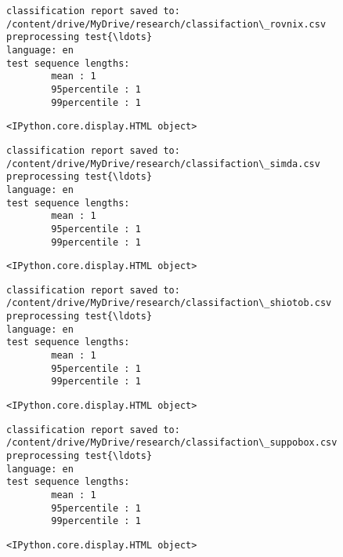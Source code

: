 \documentclass[11pt]{article}
\begin{document}
    
    \begin{Verbatim}[commandchars=\\\{\}]
classification report saved to:
/content/drive/MyDrive/research/classifaction\_rovnix.csv
preprocessing test{\ldots}
language: en
test sequence lengths:
        mean : 1
        95percentile : 1
        99percentile : 1
    \end{Verbatim}

    
    \begin{Verbatim}[commandchars=\\\{\}]
<IPython.core.display.HTML object>
    \end{Verbatim}

    
    \begin{Verbatim}[commandchars=\\\{\}]
classification report saved to:
/content/drive/MyDrive/research/classifaction\_simda.csv
preprocessing test{\ldots}
language: en
test sequence lengths:
        mean : 1
        95percentile : 1
        99percentile : 1
    \end{Verbatim}

    
    \begin{Verbatim}[commandchars=\\\{\}]
<IPython.core.display.HTML object>
    \end{Verbatim}

    
    \begin{Verbatim}[commandchars=\\\{\}]
classification report saved to:
/content/drive/MyDrive/research/classifaction\_shiotob.csv
preprocessing test{\ldots}
language: en
test sequence lengths:
        mean : 1
        95percentile : 1
        99percentile : 1
    \end{Verbatim}

    
    \begin{Verbatim}[commandchars=\\\{\}]
<IPython.core.display.HTML object>
    \end{Verbatim}

    
    \begin{Verbatim}[commandchars=\\\{\}]
classification report saved to:
/content/drive/MyDrive/research/classifaction\_suppobox.csv
preprocessing test{\ldots}
language: en
test sequence lengths:
        mean : 1
        95percentile : 1
        99percentile : 1
    \end{Verbatim}

    
    \begin{Verbatim}[commandchars=\\\{\}]
<IPython.core.display.HTML object>
    \end{Verbatim}
\end{document}
